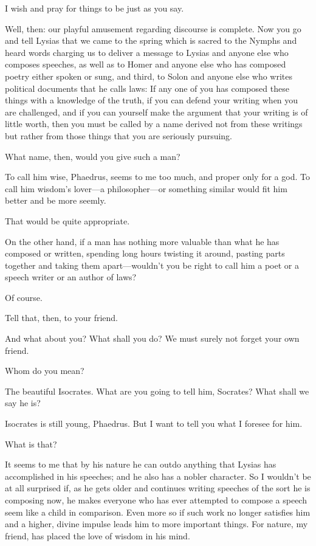 \sayphaedrus I wish and pray for things to be just as you say.

\saysocrates Well, then: our playful amusement regarding discourse is
complete. Now you go and tell Lysias that we came to the spring which is
sacred to the Nymphs and heard words charging us to deliver a message
to Lysias and anyone else who composes speeches, as well as to
Homer and anyone else who has composed poetry either spoken or sung, and
third, to Solon and anyone else who writes political documents that he
calls laws: If any one of you has composed these things with a knowledge
of the truth, if you can defend your writing when you are challenged,
and if you can yourself make the argument that your writing is of little
worth, then you must be called by a name derived not from these writings
but rather from those things that you are seriously pursuing.

\sayphaedrus What name, then, would you give such a man?

\saysocrates To call him wise, Phaedrus, seems to me too much, and proper
only for a god. To call him wisdom's lover---a philosopher---or
something similar would fit him better and be more seemly.

\sayphaedrus That would be quite appropriate.

\saysocrates On the other hand, if a man has nothing more valuable than
what he has composed or written, spending long hours twisting it around,
pasting parts together and taking them apart---wouldn't you be right to
call him a poet or a speech writer or an author of laws?

\sayphaedrus Of course.

\saysocrates Tell that, then, to your friend.

\sayphaedrus And what about you? What shall you do? We must surely not
forget your own friend.

\saysocrates Whom do you mean?

\sayphaedrus The beautiful
Isocrates. What are
you going to tell him, Socrates? What shall we say he is?

\saysocrates Isocrates is still young, Phaedrus. But I want to tell you
what I foresee for him.

\sayphaedrus What is that?

\saysocrates It seems to me that by his nature he can outdo anything that
Lysias has accomplished in his speeches; and he also has a nobler
character. So I wouldn't be at all surprised if, as he gets older and
continues writing speeches of the sort he is composing now, he makes
everyone who has ever attempted to compose a speech seem like a child in
comparison. Even more so if such work no longer satisfies him and a
higher, divine impulse leads him to more important things. For nature,
my friend, has placed the love of wisdom in his mind.

